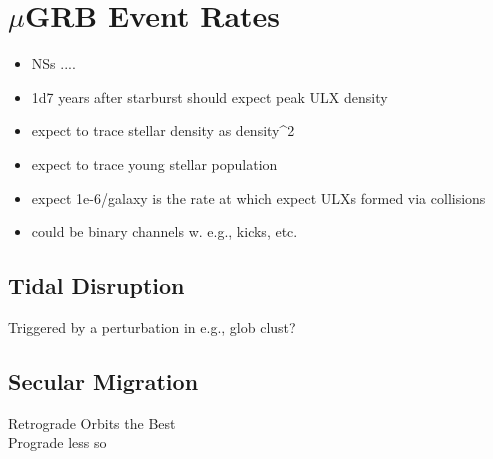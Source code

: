 \section{$\mu$GRB Event Rates}\label{section:rates}



\begin{itemize}
\item NSs  ....
\item   1d7 years after starburst should expect peak ULX density
\item   expect to trace stellar density as density^2
\item   expect to trace young stellar population
\item   expect    1e-6/galaxy    is the rate at which expect ULXs formed via collisions
\item   could be binary channels w. e.g., kicks, etc.
\end{itemize}


\subsection{Tidal Disruption}
Triggered by a perturbation in e.g., glob clust?


\subsection{Secular Migration}
Retrograde Orbits the Best\\
Prograde less so
